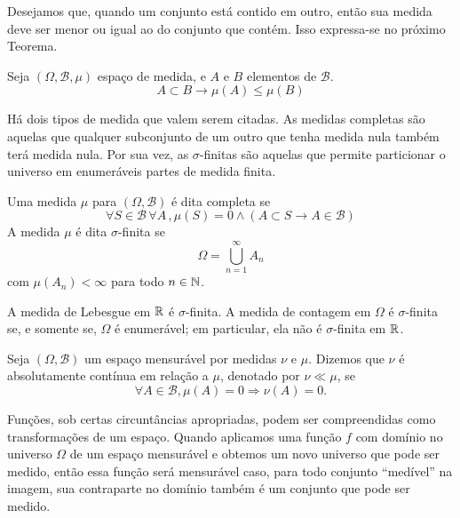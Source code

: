 Desejamos que, quando um conjunto está contido em outro, então sua medida deve ser menor
ou igual ao do conjunto que contém. Isso expressa-se no próximo Teorema.

\begin{thm:medida de subconjunto}
\label{thm:medida de subconjunto}
Seja $(\Omega, \mathcal{B}, \mu)$ espaço de medida, e $A$ e $B$ elementos de $\mathcal{B}$.
\[
	A \subset B \rightarrow \mu(A) \le \mu(B)
\]
\end{thm:medida de subconjunto}

Há dois tipos de medida que valem serem citadas.
As medidas completas são aquelas que qualquer subconjunto de um outro que tenha medida
nula também terá medida nula.
Por sua vez, as $\sigma$-finitas são aquelas que permite particionar o universo em
enumeráveis partes de medida finita.

\begin{def:medida completa}
Uma medida $\mu$ para $(\Omega, \mathcal{B})$ é dita completa se
\[
	\forall S \in \mathcal{B}\, \forall A\,, \mu(S) = 0 \land (A \subset S \rightarrow A \in \mathcal{B})
\]
A medida $\mu$ é dita $\sigma$-finita se
\[
	\Omega = \bigcup_{n=1}^\infty A_n
\]
com $\mu(A_n) < \infty$ para todo $n \in \mathbb{N}$.
\end{def:medida completa}

\begin{thm:lebesgue sigma finita}
\label{thm:sigma finita}
A medida de Lebesgue em $\mathbb{R}$ é $\sigma$-finita.
A medida de contagem em $\Omega$ é $\sigma$-finita se, e somente se, $\Omega$ é enumerável;
em particular, ela não é $\sigma$-finita em $\mathbb{R}$.
\end{thm:lebesgue sigma finita}

\begin{def:medida absolutamente continua}
\label{def:medida absolutamente continua}
Seja $(\Omega, \mathcal{B})$ um espaço mensurável por medidas $\nu$ e $\mu$.
Dizemos que $\nu$ é absolutamente contínua em relação a $\mu$, denotado por
$\nu \ll \mu$, se
\[
	\forall A \in \mathcal{B}, \mu(A) = 0 \Longrightarrow \nu(A) = 0.
\]
\end{def:medida absolutamente continua}

Funções, sob certas circuntâncias apropriadas, podem ser compreendidas como transformações
de um espaço.
Quando aplicamos uma função $f$ com domínio no universo $\Omega$ de um espaço mensurável
e obtemos um novo universo que pode ser medido, então essa função será mensurável caso,
para todo conjunto ``medível'' na imagem, sua contraparte no domínio também é um conjunto
que pode ser medido.

